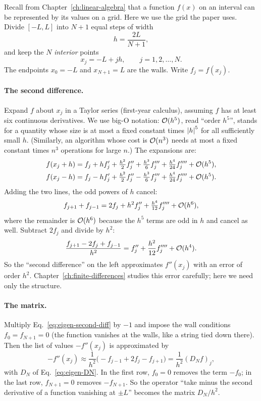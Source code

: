 Recall from Chapter~\ref{ch:linear-algebra} that a function $f(x)$ on an interval can be represented by its values on a grid. Here we use the grid the paper uses. Divide $[-L,L]$ into $N+1$ equal steps of width
\begin{equation}
h=\frac{2L}{N+1},
\label{eq:eigen-h}
\end{equation}
and keep the $N$ \emph{interior} points
\begin{equation}
x_j=-L+jh,\qquad j=1,2,\dots,N.
\label{eq:eigen-grid}
\end{equation}
The endpoints $x_0=-L$ and $x_{N+1}=L$ are the walls. Write $f_j=f(x_j)$.

\paragraph{The second difference.} Expand $f$ about $x_j$ in a Taylor series (first-year calculus), assuming $f$ has at least six continuous derivatives. We use big-O notation: $\mathcal{O}(h^5)$, read ``order $h^5$'', stands for a quantity whose size is at most a fixed constant times $\left\lvert h\right\rvert^5$ for all sufficiently small $h$. (Similarly, an algorithm whose cost is $\mathcal{O}(n^3)$ needs at most a fixed constant times $n^3$ operations for large $n$.) The expansions are:
\begin{align}
f(x_j+h)&=f_j+hf'_j+\tfrac{h^2}{2}f''_j+\tfrac{h^3}{6}f'''_j+\tfrac{h^4}{24}f''''_j+\mathcal{O}(h^5),\\
f(x_j-h)&=f_j-hf'_j+\tfrac{h^2}{2}f''_j-\tfrac{h^3}{6}f'''_j+\tfrac{h^4}{24}f''''_j+\mathcal{O}(h^5).
\end{align}
Adding the two lines, the odd powers of $h$ cancel:
\begin{equation}
f_{j+1}+f_{j-1}=2f_j+h^2f''_j+\tfrac{h^4}{12}f''''_j+\mathcal{O}(h^6),
\end{equation}
where the remainder is $\mathcal{O}(h^6)$ because the $h^5$ terms are odd in $h$ and cancel as well. Subtract $2f_j$ and divide by $h^2$:
\begin{equation}
\frac{f_{j+1}-2f_j+f_{j-1}}{h^2}=f''_j+\frac{h^2}{12}f''''_j+\mathcal{O}(h^4).
\label{eq:eigen-second-diff}
\end{equation}
So the ``second difference'' on the left approximates $f''(x_j)$ with an error of order $h^2$. Chapter~\ref{ch:finite-differences} studies this error carefully; here we need only the structure.

\paragraph{The matrix.} Multiply Eq.~\eqref{eq:eigen-second-diff} by $-1$ and impose the wall conditions $f_0=f_{N+1}=0$ (the function vanishes at the walls, like a string tied down there). Then the list of values $-f''(x_j)$ is approximated by
\begin{equation}
-f''(x_j)\approx\frac{1}{h^2}\bigl(-f_{j-1}+2f_j-f_{j+1}\bigr)=\frac{1}{h^2}(D_Nf)_j,
\end{equation}
with $D_N$ of Eq.~\eqref{eq:eigen-DN}. In the first row, $f_0=0$ removes the term $-f_0$; in the last row, $f_{N+1}=0$ removes $-f_{N+1}$. So the operator ``take minus the second derivative of a function vanishing at $\pm L$'' becomes the matrix $D_N/h^2$.

